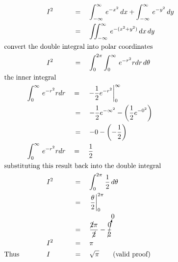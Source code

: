 \begin{alignat*}{5}
&\,&&\qquad\quad I^2&&\,=\quad\int_{-\infty}^\infty\,e^{-x^2}\,dx+\int_{-\infty}^\infty\,e^{-y^2}\,dy\\
&\,&&\,&&\,=\quad\iint_{-\infty}^\infty\,e^{-(x^2+y^2)}\,dx\,dy\\
&\rlap{\text{convert the double integral into polar coordinates}}\\
&\,&&\qquad\quad I^2&&\,=\quad\int_0^{2\pi}\int_0^\infty\,e^{-r^2}rdr\,d\theta\\
&\rlap{\text{the inner integral}}\\
&\,&&\int_0^\infty\,e^{-r^2}rdr&&=\quad\left.-\frac{1}{2}e^{-r^2}\right\vert_0^\infty\\
&\,&&\,&&\,=\quad-\frac{1}{2}e^{-\infty^2}-\left(\frac{1}{2}e^{-0^2}\right)\\
&\,&&\,&&\,=\quad-0-\left(-\frac{1}{2}\right)\\
&\,&&\int_0^\infty\,e^{-r^2}rdr&&=\quad\frac{1}{2}\\
&\rlap{\text{substituting this result back into the double integral}}\\
&\,&&\qquad\quad I^2&&\,=\quad\int_0^{2\pi}\,\frac{1}{2}\,d\theta\\
&\,&&\,&&\,=\quad\left.\frac{\theta}{2}\right\vert_0^{2\pi}\\
&\,&&\,&&\,=\quad\frac{\cancel{2}\pi}{\cancel{2}}-\cancelto{0}{\frac{0}{2}}\\
&\,&&\qquad\quad I^2&&\,=\quad\pi\\
&\text{Thus}&&\qquad\quad I&&\,=\quad\sqrt{\pi}\qquad\text{(valid proof)}
\end{alignat*}
